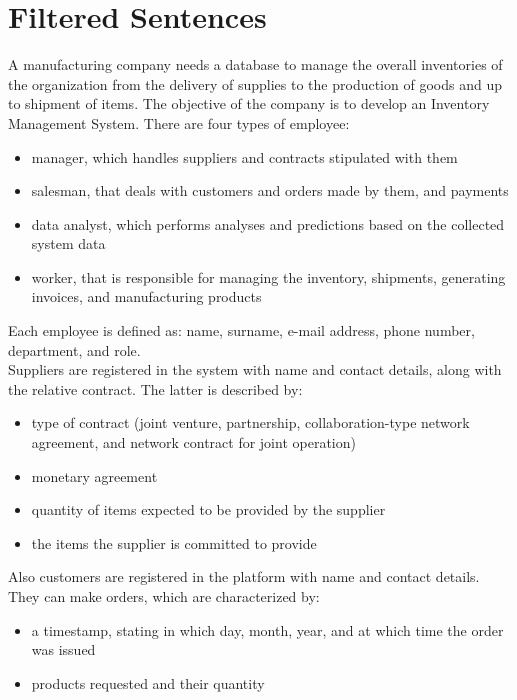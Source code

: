 \section{Filtered Sentences}

A manufacturing company needs a database to manage the overall inventories of the organization from the delivery of supplies to the production of goods and up to shipment of items. The objective of the company is to develop an Inventory Management System.
There are four types of employee:
\begin{itemize}
	\item manager, which handles suppliers and contracts stipulated with them
	\item salesman, that deals with customers and orders made by them, and payments
	\item data analyst, which performs analyses and predictions based on the collected system data
	\item worker, that is responsible for managing the inventory, shipments, generating invoices, and manufacturing products
\end{itemize}
Each employee is defined as: name, surname, e-mail address, phone number, department, and role.\\
Suppliers are registered in the system with name and contact details, along with the relative contract. The latter is described by:
\begin{itemize}
	\item type of contract (joint venture, partnership, collaboration-type network agreement, and network contract for joint operation)
	\item monetary agreement
	\item quantity of items expected to be provided by the supplier
	\item the items the supplier is committed to provide
\end{itemize}
Also customers are registered in the platform with name and contact details. They can make orders, which are characterized by:
\begin{itemize}
	\item a timestamp, stating in which day, month, year, and at which time the order was issued
	\item products requested and their quantity
\end{itemize}